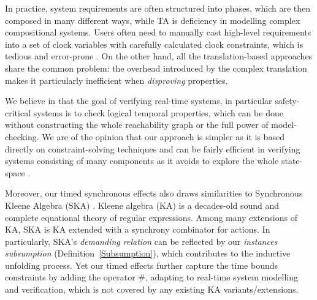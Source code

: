 \documentclass[acmsmall,review,anonymous]{acmart}\settopmatter{printfolios=true,printccs=false,printacmref=false}
\newcommand{\code}[1]{{\tt{\ensuremath{\m{#1}}}}}
\newcommand{\m}{\mathit}
\newcommand\defref[1]{Definition~\textcolor{blue}{\ref{#1}}}
\begin{document}

In practice, system requirements are often structured into phases, which are then composed in many different ways, while TA is deficiency in modelling complex compositional systems. Users often need to manually cast high-level requirements into a set of clock variables with carefully calculated clock constraints, which is tedious and error-prone \cite{sun2013modeling}. 
On the other hand, all the translation-based approaches share the common problem: 
the overhead introduced by
the complex translation makes it particularly inefficient when \emph{disproving} properties. 

We believe in that the goal of verifying real-time systems, in particular safety-critical systems is to check logical temporal properties, which can be done without constructing the whole reachability graph or the full power of model-checking. We are of the opinion that our approach is simpler as it is based directly on constraint-solving techniques and can be fairly efficient in verifying systems consisting of many components as it avoids to explore the whole state-space \cite{song2020automated,yi1995automatic}.


Moreover, our timed synchronous effects also draws similarities to Synchronous Kleene Algebra (SKA) \cite{prisacariu2010synchronous}. 
Kleene algebra (KA) is a decades-old sound and complete equational theory of regular expressions. Among many extensions of KA,
  SKA is KA extended with a synchrony combinator for actions. In particularly, SKA's \emph{demanding relation} can be reflected by our \emph{instances subsumption} (\defref{Subsumption}), which contributes to the inductive unfolding process. 
Yet our timed effects further capture the time bounds constraints by adding the operator \code{\#}, adapting to real-time system modelling and verification, which is not covered by any existing KA variants/extensions. 
\end{document}
